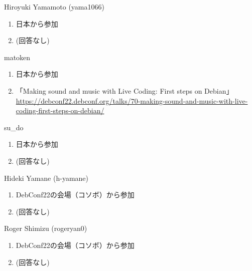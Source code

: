 \begin{prework}{ Hiroyuki Yamamoto (yama1066) }
  \begin{enumerate}
  \item 日本から参加
  \item (回答なし)
  \end{enumerate}
\end{prework}

\begin{prework}{ matoken }
  \begin{enumerate}
  \item 日本から参加
  \item 「Making sound and music with Live Coding: First steps on Debian」\url{https://debconf22.debconf.org/talks/70-making-sound-and-music-with-live-coding-first-steps-on-debian/}
  \end{enumerate}
\end{prework}

\begin{prework}{ su\_do }
  \begin{enumerate}
  \item 日本から参加
  \item (回答なし)
  \end{enumerate}
\end{prework}

\begin{prework}{ Hideki Yamane (h-yamane) }
  \begin{enumerate}
  \item DebConf22の会場（コソボ）から参加
  \item (回答なし)
  \end{enumerate}
\end{prework}

\begin{prework}{ Roger Shimizu (rogeryan0) }
  \begin{enumerate}
  \item DebConf22の会場（コソボ）から参加
  \item (回答なし)
  \end{enumerate}
\end{prework}
